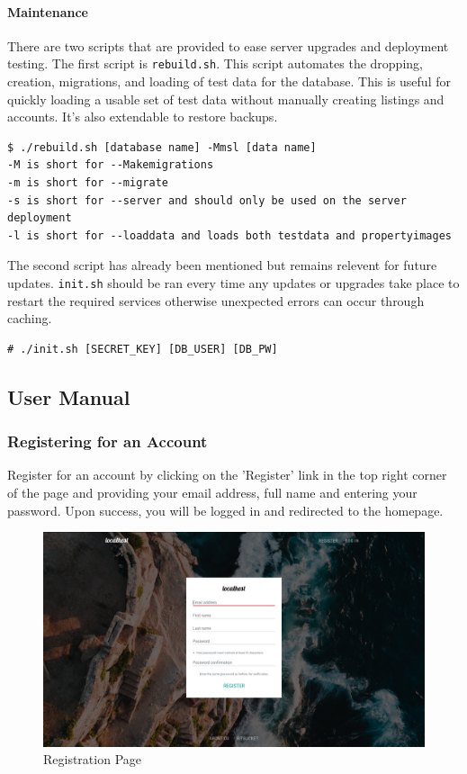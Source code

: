 \paragraph{Maintenance}

There are two scripts that are provided to ease server upgrades and deployment
testing. The first script is \lstinline{rebuild.sh}. This script automates the
dropping, creation, migrations, and loading of test data for the database.
This is useful for quickly loading a usable set of test data without manually
creating listings and accounts. It's also extendable to restore backups.
\begin{lstlisting}
$ ./rebuild.sh [database name] -Mmsl [data name]
-M is short for --Makemigrations
-m is short for --migrate
-s is short for --server and should only be used on the server deployment
-l is short for --loaddata and loads both testdata and propertyimages
\end{lstlisting}

The second script has already been mentioned but remains relevent for future
updates. \lstinline{init.sh} should be ran every time any updates or upgrades
take place to restart the required services otherwise unexpected errors can
occur through caching.
\begin{lstlisting}
# ./init.sh [SECRET_KEY] [DB_USER] [DB_PW]
\end{lstlisting}

\subsection{User Manual}
\subsubsection{Registering for an Account}
Register for an account by clicking on the 'Register' link in the top right 
corner of the page and providing your email address, full name and entering
your password. Upon success, you will be logged in and redirected to the
homepage.

\begin{figure}[!h]
  \includegraphics[width=\linewidth]{assets/userManual/regPg.png}
  \caption{Registration Page}
  \label{fig:regPg}
\end{figure}

